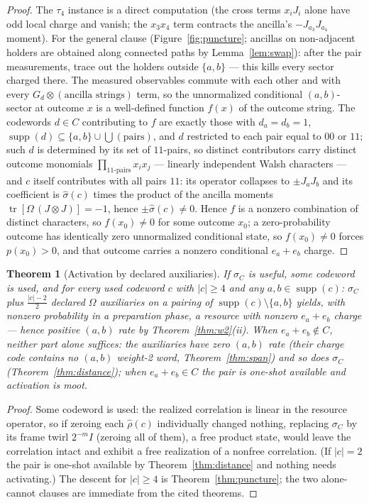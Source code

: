 \documentclass[11pt]{article}
\theoremstyle{plain}
\newtheorem{theorem}{Theorem}[section]
\theoremstyle{definition}
\theoremstyle{remark}
\theoremstyle{plain}
\newcommand{\tr}{\operatorname{tr}}
\newcommand{\Om}{\Omega}
\newcommand{\supp}{\operatorname{supp}}
\begin{document}
\begin{proof}
The $\tau_4$ instance is a direct computation (the cross terms
$x_iJ_i$ alone have odd local charge and vanish; the
$x_3x_4$ term contracts the ancilla's $-J_{a_3}J_{a_4}$ moment).
For the general clause (Figure~\ref{fig:puncture}; ancillas on
non-adjacent holders are obtained along connected paths by
Lemma~\ref{lem:swap}): after the pair measurements, trace out the
holders outside $\{a,b\}$ --- this kills every sector charged
there. The measured observables commute with each other and with
every $G_d\otimes(\text{ancilla strings})$ term, so the
unnormalized conditional $(a,b)$-sector at outcome $x$ is a
well-defined function $f(x)$ of the outcome string. The
codewords $d\in C$ contributing to $f$ are exactly those with
$d_a = d_b = 1$,
$\supp(d)\subseteq\{a,b\}\cup\bigcup(\text{pairs})$, and $d$
restricted to each pair equal to $00$ or $11$; such $d$ is
determined by its set of $11$-pairs, so distinct contributors
carry distinct outcome monomials $\prod_{\text{$11$-pairs}}x_ix_j$
--- linearly independent Walsh characters --- and $c$ itself
contributes with all pairs $11$: its operator collapses to
$\pm J_aJ_b$ and its coefficient is $\hat\sigma(c)$ times the
product of the ancilla moments
$\tr[\Om\,(J\otimes J)] = -1$, hence $\pm\hat\sigma(c)\neq0$.
Hence
$f$ is a nonzero combination of distinct characters, so
$f(x_0)\neq0$ for some outcome $x_0$; a zero-probability outcome
has identically zero unnormalized conditional state, so
$f(x_0)\neq0$ forces $p(x_0)>0$, and that outcome carries a
nonzero conditional $e_a+e_b$ charge.
\end{proof}

\begin{theorem}[Activation by declared auxiliaries]
\label{thm:activation}
If $\sigma_C$ is useful, some codeword is used, and for every used
codeword $c$ with $|c|\ge4$ and any $a,b\in\supp(c)$: $\sigma_C$
plus $\tfrac{|c|-2}2$ declared $\Om$ auxiliaries on a pairing of
$\supp(c)\setminus\{a,b\}$ yields, with nonzero probability in a
preparation phase, a resource with nonzero $e_a+e_b$ charge ---
hence positive $(a,b)$ rate by Theorem~\ref{thm:w2}(ii). When
$e_a+e_b\notin C$, neither part alone suffices: the auxiliaries
have zero $(a,b)$ rate (their charge code contains no $(a,b)$
weight-2 word, Theorem~\ref{thm:span}) and so does $\sigma_C$
(Theorem~\ref{thm:distance}); when $e_a+e_b\in C$ the pair is
one-shot available and activation is moot.
\end{theorem}

\begin{proof}
Some codeword is used: the realized correlation is linear in the
resource operator, so if zeroing each $\hat\rho(c)$ individually
changed nothing, replacing $\sigma_C$ by its frame twirl
$2^{-m}I$ (zeroing all of them), a free product state, would
leave the correlation intact and exhibit a free realization of a
nonfree correlation. (If $|c| = 2$ the pair is one-shot available
by Theorem~\ref{thm:distance} and nothing needs activating.) The
descent for $|c|\ge4$ is Theorem~\ref{thm:puncture}; the two
alone-cannot clauses are immediate from the cited theorems.
\end{proof}
\end{document}
